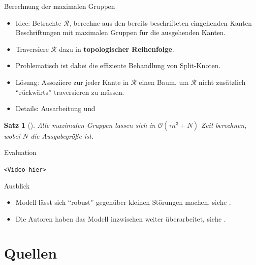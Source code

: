 \documentclass[
wide,
10pt,
xcolor={x11names,svgnames},
hyperref={pdfauthor={Jannes Bantje},colorlinks,urlcolor=maincolor,hidelinks=false,linkcolor=maincolor},
pantone312, 	%
euler-digits,
]{beamer}
\newcommand{\bet}[1]{\textbf{\color{maincolor}#1}}
\newtheorem{satz}{Satz}
\theoremstyle{definition}
\begin{document}
\begin{frame}{Berechnung der maximalen Gruppen}
    \begin{itemize}
        \item Idee: Betrachte $\mathcal{R}$, berechne aus den bereits beschrifteten eingehenden Kanten Beschriftungen mit maximalen Gruppen für die ausgehenden Kanten.
        \item Traversiere $\mathcal{R}$ dazu in \bet{topologischer Reihenfolge}.
        \item Problematisch ist dabei die effiziente Behandlung von Split-Knoten.
        \item Lösung: Assoziiere zur jeder Kante in $\mathcal{R}$ einen Baum, um $\mathcal{R}$ nicht zusätzlich \enquote{rückwärts} traversieren zu müssen.
        \item Details: Ausarbeitung und \textcite{buchin2015}
    \end{itemize}
    \begin{satz}[{\cite[Thm.~9]{buchin2015}}]
        Alle maximalen Gruppen lassen sich in $\mathcal{O}(\tau n^3 + N)$ Zeit berechnen, wobei $N$ die Ausgabegröße ist.
    \end{satz}
\end{frame}

\begin{frame}{Evaluation}
    \begin{center}
        \texttt{<Video hier>}
    \end{center}
\end{frame}

\begin{frame}{Ausblick}
    \begin{itemize}
        \item Modell lässt sich \enquote{robust} gegenüber kleinen Störungen machen, siehe \textcite[Sec.~4]{buchin2015}.
        \item Die Autoren haben das Modell inzwischen weiter überarbeitet, siehe \textcite{grouping_improved}.
    \end{itemize}
\end{frame}


\section*{Quellen}
\begin{frame}[allowframebreaks]{\secname}
	\printbibliography
\end{frame}
\end{document}
